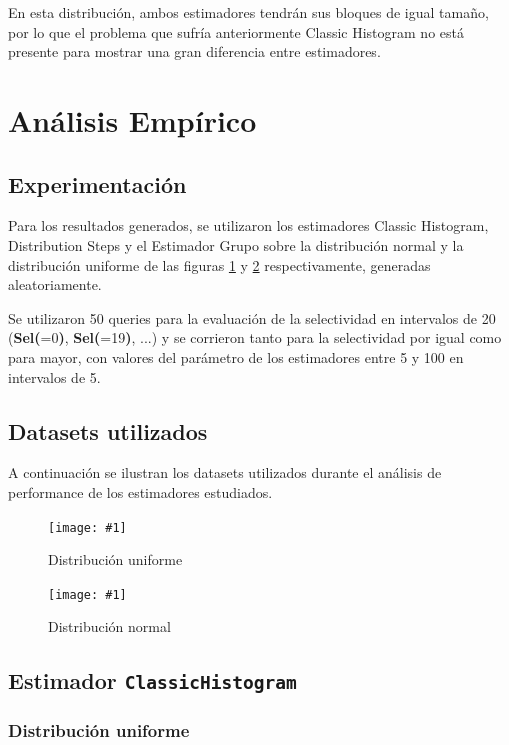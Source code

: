 \documentclass[a4paper, 10pt, twoside]{article}
\newcommand{\grafico}[3]{
  \begin{figure}[H]
    \texttt{[image: \#1]}
    \caption{#2}
    \label{#3}
  \end{figure}
}
\begin{document}
En esta distribución, ambos estimadores tendrán sus bloques de igual tamaño, por lo que el problema que sufría anteriormente Classic Histogram no está presente para mostrar una gran diferencia entre estimadores.




\section{Análisis Empírico}

\subsection{Experimentación}
Para los resultados generados, se utilizaron los estimadores Classic Histogram, Distribution Steps y el Estimador Grupo 
sobre la distribución normal y la distribución uniforme de las figuras \ref{custom-dataset-uniform} y 
\ref{custom-dataset-normal} respectivamente, generadas aleatoriamente. 

Se utilizaron 50 queries para la evaluación de la selectividad en intervalos de 20 (\textbf{Sel(}=0\textbf{)}, \textbf{Sel(}=19\textbf{)}, ...) y se corrieron tanto para la selectividad por igual como para mayor, con valores del parámetro de los estimadores entre 5 y 100 en intervalos de 5.

\subsection{Datasets utilizados}

A continuación se ilustran los datasets utilizados durante el análisis de performance de los estimadores estudiados.

\grafico{custom-dataset-uniform}
        {Distribución uniforme}
        {custom-dataset-uniform}

\grafico{custom-dataset-normal}
        {Distribución normal}
        {custom-dataset-normal}


\subsection{Estimador \texttt{ClassicHistogram}}

\subsubsection{Distribución uniforme}
\end{document}
